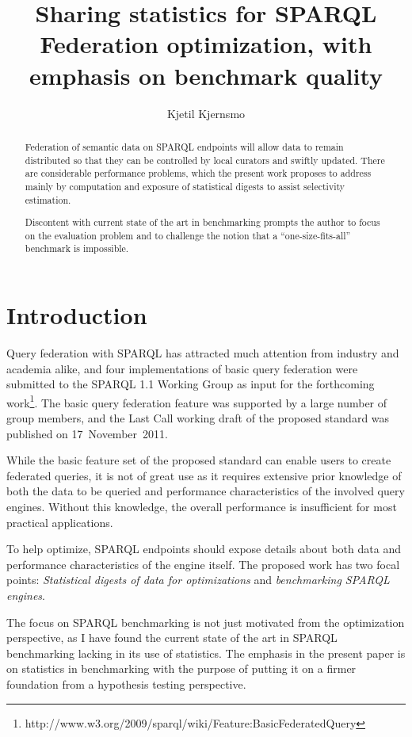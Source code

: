 \documentclass{llncs}
\title{Sharing statistics for SPARQL Federation optimization, with
  emphasis on benchmark quality}
\author{Kjetil Kjernsmo\inst{1}}
\institute{Department of Informatics,
Postboks 1080 Blindern,
0316 Oslo, Norway
\email{kjekje@ifi.uio.no}}
\begin{document}
\maketitle



\begin{abstract}
  Federation of semantic data on SPARQL endpoints will allow data to
  remain distributed so that they can be controlled by local curators
  and swiftly updated. There are considerable performance problems,
  which the present work proposes to address mainly by computation
  and exposure of statistical digests to assist selectivity
  estimation.

  Discontent with current state of the art in benchmarking prompts the
  author to focus on the evaluation problem and to challenge the
  notion that a ``one-size-fits-all'' benchmark is impossible.
\end{abstract}

\section{Introduction}

Query federation with SPARQL has attracted much attention
from industry and academia alike, and four implementations of basic
query federation were submitted to the SPARQL 1.1 Working Group as
input for the forthcoming
work\footnote{http://www.w3.org/2009/sparql/wiki/Feature:BasicFederatedQuery}. 
The basic query federation feature was
supported by a large number of group members, and the Last Call working
draft of the proposed standard was published on 17~November~2011.

While the basic feature set of the proposed standard can enable users
to create federated queries, it is not of great use as it requires
extensive prior knowledge of both the data to be queried and
performance characteristics of the involved query engines. Without
this knowledge, the overall performance is insufficient for most
practical applications.

To help optimize, SPARQL endpoints should expose details about both
data and performance characteristics of the engine itself. The
proposed work has two focal points: \emph{Statistical digests of
  data for optimizations} and \emph{benchmarking SPARQL engines}. 

The focus on SPARQL benchmarking is not just motivated from the
optimization perspective, as I have found the current state of the art
in SPARQL benchmarking lacking in its use of statistics. The emphasis
in the present paper is on statistics in benchmarking with the purpose
of putting it on a firmer foundation from a hypothesis testing
perspective.
\end{document}
